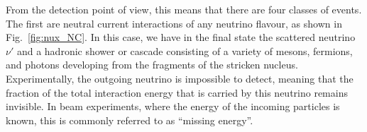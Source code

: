 From the detection point of view, this means that there are four classes of
events. The first are neutral current interactions of any neutrino flavour, as
shown in Fig.~\ref{fig:nux_NC}. In this case, we have in the final state the
scattered neutrino $\nu'$ and a hadronic shower or cascade consisting
of a variety of mesons, fermions, and photons developing from the fragments of
the stricken nucleus. Experimentally, the outgoing neutrino is impossible to
detect, meaning that the fraction of the total interaction energy that is
carried by this neutrino remains invisible. In beam experiments, where the
energy of the incoming particles is known, this is commonly referred to as
``missing energy''.

\begin{figure}
\centering
  \quad
  \quad
\end{figure}
